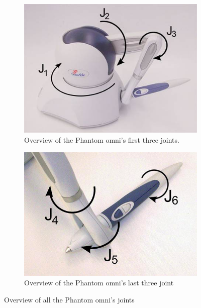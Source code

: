 \documentclass[conference]{IEEEtran}
\begin{document}
\begin{figure}
	\centering
	\begin{subfigure}{.22\textwidth}
		\centering
		\includegraphics[width=\linewidth]{haptick1.jpg}
		\caption{Overview of the Phantom omni's first three joints.}
		\label{fig:phantom1}
	\end{subfigure}
	\begin{subfigure}{.22\textwidth}
		\centering
		\includegraphics[width=\linewidth]{haptick2.png}
		\caption{Overview of the Phantom omni's last three joint}
		\label{fig:phantom2}
	\end{subfigure}
\caption{Overview of all the Phantom omni's joints\cite{phantom_omni}}
\label{fig:phantom_omni}
\end{figure}
\end{document}
